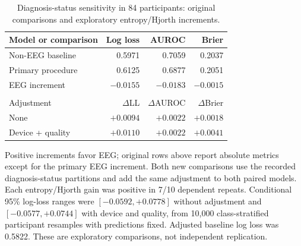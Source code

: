 \begin{table}[!htbp]
\centering\small
\caption{Diagnosis-status sensitivity in 84 participants: original comparisons and exploratory entropy/Hjorth increments.}
\label{tab:diagnosis}
\setlength{\tabcolsep}{4pt}\renewcommand{\arraystretch}{1.14}
\begin{tabularx}{\textwidth}{@{}>{\raggedright\arraybackslash}Xrrr@{}}
\toprule
Model or comparison & Log loss & AUROC & Brier\\\midrule
Non-EEG baseline & 0.5971 & 0.7059 & 0.2037\\
Primary procedure & 0.6125 & 0.6877 & 0.2051\\
\midrule EEG increment & $-0.0155$ & $-0.0183$ & $-0.0015$\\
\midrule\multicolumn{4}{l}{\textit{Exploratory entropy/Hjorth increments}}\\
Adjustment & $\Delta$LL & $\Delta$AUROC & $\Delta$Brier\\\midrule
None & $+0.0094$ & $+0.0022$ & $+0.0018$\\
Device + quality & $+0.0110$ & $+0.0022$ & $+0.0041$\\
\bottomrule\end{tabularx}
\par\smallskip\begin{minipage}{\textwidth}\footnotesize Positive increments favor EEG; original rows above report absolute metrics except for the primary EEG increment. Both new comparisons use the recorded diagnosis-status partitions and add the same adjustment to both paired models. Each entropy/Hjorth gain was positive in 7/10 dependent repeats. Conditional 95\% log-loss ranges were $[-0.0592,+0.0778]$ without adjustment and $[-0.0577,+0.0744]$ with device and quality, from 10,000 class-stratified participant resamples with predictions fixed. Adjusted baseline log loss was 0.5822. These are exploratory comparisons, not independent replication.\end{minipage}
\end{table}

